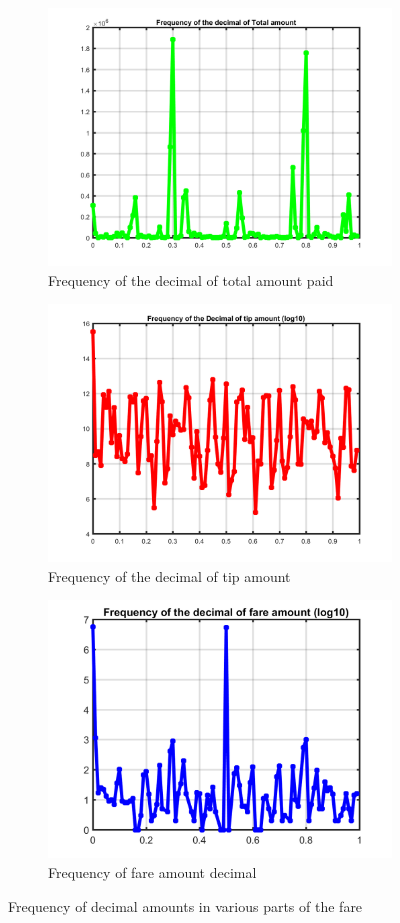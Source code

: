 \documentclass{article}
\begin{document}
\begin{figure}[H]
\centering
\begin{subfigure}{.5\linewidth}
  \centering
  \includegraphics[width=.8\linewidth]{frequency-decimal-totalamount}
  \caption{Frequency of the decimal of total amount paid}
  \label{sub:dec_tamount}
\end{subfigure}%
\begin{subfigure}{.5\linewidth}
  \centering
  \includegraphics[width=.8\linewidth]{frequency-decimal-tipamount}
  \caption{Frequency of the decimal of tip amount}
  \label{sub:dec_tip_amount}
\end{subfigure}%
\vspace{1cm}
\begin{subfigure}{\linewidth}
  \centering
  \includegraphics[width=.4\linewidth]{frequency-decimal-fareamount}
  \caption{Frequency of fare amount decimal}
  \label{fig:sub7}
\end{subfigure}%
	
\caption{Frequency of decimal amounts in various parts of the fare}
\label{fig:decimals}
\end{figure}
\end{document}
